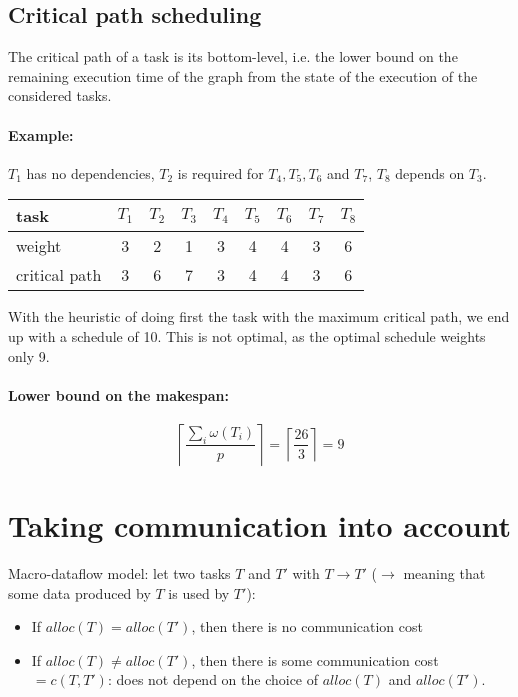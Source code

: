 \subsection{Critical path scheduling}
\begin{defi}
The critical path of a task is its bottom-level, i.e. the lower bound on the remaining execution time of the graph from the state of the execution of the considered tasks.
\end{defi}

\paragraph{Example:}
$T_1$ has no dependencies, $T_2$ is required for $T_4, T_5, T_6$ and $T_7$, $T_8$ depends on $T_3$.

\begin{center}
\begin{tabular}{l | c | c |c|c|c|c|c|c}
task & $T_1$ & $T_2$ & $T_3$ & $T_4$ & $T_5$ & $T_6$ & $T_7$ & $T_8$ \\
\hline
weight & 3 & 2 & 1& 3 & 4 & 4 & 3 & 6\\
\hline
critical path & 3 & 6 & 7 & 3 & 4 & 4 & 3 & 6\\
\end{tabular}
\end{center}

With the heuristic of doing first the task with the maximum critical path, we end up with a schedule of 10. This is not optimal, as the optimal schedule weights only 9.

\paragraph{Lower bound on the makespan:}
\[ \left\lceil \frac{\sum_{i}\omega (T_i)}{p}\right\rceil = \left\lceil \frac{26}{3} \right\rceil = 9\]


\section{Taking communication into account}
Macro-dataflow model: let two tasks $T$ and $T'$ with $T \to T'$ ($\to$ meaning that some data produced by $T$ is used by $T'$):
\begin{itemize}
\item If $alloc(T)=alloc(T')$, then there is no communication cost
\item If $alloc(T)\neq alloc(T')$, then there is some communication cost $= c(T,T')$: does not depend on the choice of $alloc(T)$ and $alloc(T')$.
\end{itemize}

